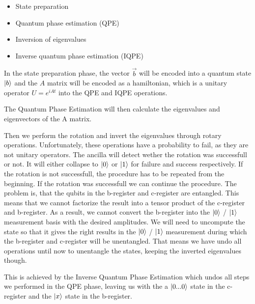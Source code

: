 \begin{itemize}
\item State preparation
\item Quantum phase estimation (QPE)
\item Inversion of eigenvalues
\item Inverse quantum phase estimation (IQPE)
\end{itemize}

In the state preparation phase, the vector $\vec{b}$ will be encoded into a quantum state $\ket{b}$ and the $A$ matrix will be encoded as a hamiltonian, which is a unitary operator
$U=e^{iAt}$ into the QPE and IQPE operations.

The Quantum Phase Estimation will then calculate the eigenvalues and eigenvectors of the A matrix.

Then we perform the rotation and invert the eigenvalues through rotary operations. Unfortunately, these operations have a probability to fail, as they are not unitary operators.
The ancilla will detect wether the rotation was successfull or not. It will either collapse to $\ket0$ or $\ket1$ for failure and success respectively.
If the rotation is not successfull, the procedure has to be repeated from the beginning. 
If the rotation was successfull we can continue the procedure. 
The problem is, that the qubits in the b-register and c-register are entangled. 
This means that we cannot factorize the result into a tensor product of the c-register and b-register.
As a result, we cannot convert the b-register into the $\ket 0$ / $\ket 1$ measurement basis with the desired amplitudes.
We will need to uncompute the state so that it gives the right results in the $\ket 0$ / $\ket 1$ measurement during which the b-register and c-register will be unentangled.
That means we have undo all operations until now to unentangle the states, keeping the inverted eigenvalues though.

This is achieved by the Inverse Quantum Phase Estimation which undos all steps we performed in the QPE phase, leaving us with the a $\ket{0...0}$ state in the c-register and the $\ket x$ state in the b-register.

